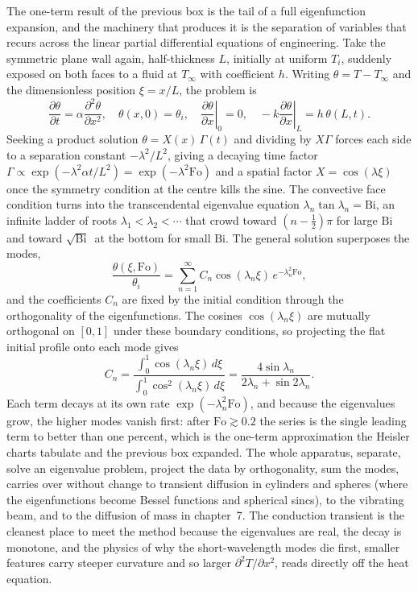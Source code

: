 \begin{mastery}
The one-term result of the previous box is the tail of a full eigenfunction
expansion, and the machinery that produces it is the separation of variables
that recurs across the linear partial differential equations of engineering.
Take the symmetric plane wall again, half-thickness $L$, initially at uniform
$T_i$, suddenly exposed on both faces to a fluid at $T_\infty$ with coefficient
$h$. Writing $\theta = T - T_\infty$ and the dimensionless position
$\xi = x/L$, the problem is
\[
\frac{\partial \theta}{\partial t} = \alpha \frac{\partial^2 \theta}{\partial
x^2}, \quad \theta(x,0) = \theta_i, \quad \left.\frac{\partial \theta}{\partial
x}\right|_{0} = 0, \quad -k\left.\frac{\partial \theta}{\partial x}\right|_{L}
= h\,\theta(L,t).
\]
Seeking a product solution $\theta = X(x)\,\Gamma(t)$ and dividing by
$X\Gamma$ forces each side to a separation constant $-\lambda^2/L^2$, giving a
decaying time factor $\Gamma \propto \exp(-\lambda^2 \alpha t/L^2) =
\exp(-\lambda^2 \text{Fo})$ and a spatial factor $X = \cos(\lambda \xi)$ once
the symmetry condition at the centre kills the sine. The convective face
condition turns into the transcendental eigenvalue equation
$\lambda_n \tan\lambda_n = \text{Bi}$, an infinite ladder of roots
$\lambda_1 < \lambda_2 < \cdots$ that crowd toward $(n-\tfrac12)\pi$ for large
$\text{Bi}$ and toward $\sqrt{\text{Bi}}\,$ at the bottom for small $\text{Bi}$.
The general solution superposes the modes,
\[
\frac{\theta(\xi,\text{Fo})}{\theta_i} = \sum_{n=1}^{\infty} C_n
\cos(\lambda_n \xi)\,e^{-\lambda_n^2 \text{Fo}},
\]
and the coefficients $C_n$ are fixed by the initial condition through the
orthogonality of the eigenfunctions. The cosines $\cos(\lambda_n \xi)$ are
mutually orthogonal on $[0,1]$ under these boundary conditions, so projecting
the flat initial profile onto each mode gives
\[
C_n = \frac{\displaystyle\int_0^1 \cos(\lambda_n \xi)\,d\xi}
{\displaystyle\int_0^1 \cos^2(\lambda_n \xi)\,d\xi} =
\frac{4\sin\lambda_n}{2\lambda_n + \sin 2\lambda_n}.
\]
Each term decays at its own rate $\exp(-\lambda_n^2 \text{Fo})$, and because the
eigenvalues grow, the higher modes vanish first: after $\text{Fo} \gtrsim 0.2$
the series is the single leading term to better than one percent, which is the
one-term approximation the Heisler charts tabulate and the previous box
expanded. The whole apparatus, separate, solve an eigenvalue problem, project
the data by orthogonality, sum the modes, carries over without change to
transient diffusion in cylinders and spheres (where the eigenfunctions become
Bessel functions and spherical sincs), to the vibrating beam, and to the
diffusion of mass in chapter~7. The conduction transient is the cleanest place
to meet the method because the eigenvalues are real, the decay is monotone, and
the physics of why the short-wavelength modes die first, smaller features carry
steeper curvature and so larger $\partial^2 T/\partial x^2$, reads directly off
the heat equation.
\end{mastery}

